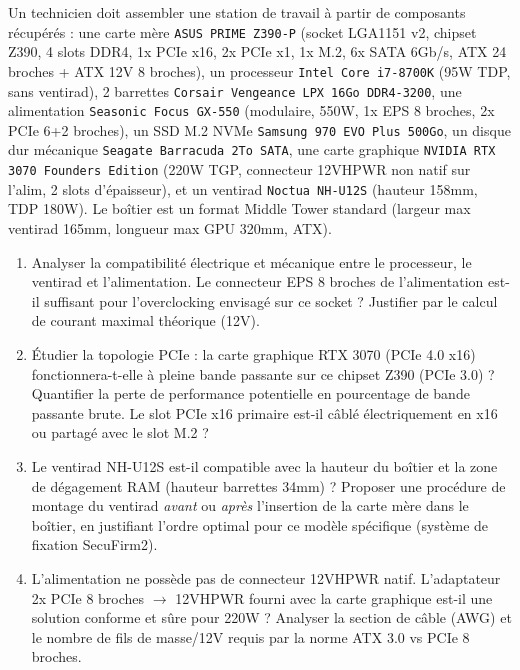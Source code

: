 \documentclass[11pt]{article}
\begin{document}
\begin{exercice}
Un technicien doit assembler une station de travail à partir de composants récupérés : une carte mère \texttt{ASUS PRIME Z390-P} (socket LGA1151 v2, chipset Z390, 4 slots DDR4, 1x PCIe x16, 2x PCIe x1, 1x M.2, 6x SATA 6Gb/s, ATX 24 broches + ATX 12V 8 broches), un processeur \texttt{Intel Core i7-8700K} (95W TDP, sans ventirad), 2 barrettes \texttt{Corsair Vengeance LPX 16Go DDR4-3200}, une alimentation \texttt{Seasonic Focus GX-550} (modulaire, 550W, 1x EPS 8 broches, 2x PCIe 6+2 broches), un SSD M.2 NVMe \texttt{Samsung 970 EVO Plus 500Go}, un disque dur mécanique \texttt{Seagate Barracuda 2To SATA}, une carte graphique \texttt{NVIDIA RTX 3070 Founders Edition} (220W TGP, connecteur 12VHPWR non natif sur l'alim, 2 slots d'épaisseur), et un ventirad \texttt{Noctua NH-U12S} (hauteur 158mm, TDP 180W). Le boîtier est un format Middle Tower standard (largeur max ventirad 165mm, longueur max GPU 320mm, ATX).
\begin{enumerate}
    \item Analyser la compatibilité électrique et mécanique entre le processeur, le ventirad et l'alimentation. Le connecteur EPS 8 broches de l'alimentation est-il suffisant pour l'overclocking envisagé sur ce socket ? Justifier par le calcul de courant maximal théorique (12V).
    \item Étudier la topologie PCIe : la carte graphique RTX 3070 (PCIe 4.0 x16) fonctionnera-t-elle à pleine bande passante sur ce chipset Z390 (PCIe 3.0) ? Quantifier la perte de performance potentielle en pourcentage de bande passante brute. Le slot PCIe x16 primaire est-il câblé électriquement en x16 ou partagé avec le slot M.2 ?
    \item Le ventirad NH-U12S est-il compatible avec la hauteur du boîtier et la zone de dégagement RAM (hauteur barrettes 34mm) ? Proposer une procédure de montage du ventirad \textit{avant} ou \textit{après} l'insertion de la carte mère dans le boîtier, en justifiant l'ordre optimal pour ce modèle spécifique (système de fixation SecuFirm2).
    \item L'alimentation ne possède pas de connecteur 12VHPWR natif. L'adaptateur 2x PCIe 8 broches $\to$ 12VHPWR fourni avec la carte graphique est-il une solution conforme et sûre pour 220W ? Analyser la section de câble (AWG) et le nombre de fils de masse/12V requis par la norme ATX 3.0 vs PCIe 8 broches.
\end{enumerate}
\end{exercice}
\end{document}
